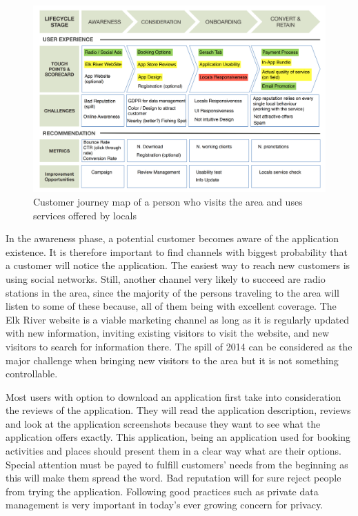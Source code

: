 \begin{figure}[!htb]
\centering
\includegraphics[width=1.0\textwidth]{Img/Customer_journey_map}
\caption{Customer journey map of a person who visits the area and uses services offered by locals}
\end{figure}

In the awareness phase, a potential customer becomes aware of the application existence. It is therefore important to find channels with biggest probability that a customer will notice the application. The easiest way to reach new customers is using social networks. Still, another channel very likely to succeed are radio stations in the area, since the majority of the persons traveling to the area will listen to some of these because, all of them being with excellent coverage. The Elk River website is a viable marketing channel as long as it is regularly updated with new information, inviting existing visitors to visit the website, and new visitors to search for information there. The spill of 2014 can be considered as the major challenge when bringing new visitors to the area but it is not something controllable. 

Most users with option to download an application first take into consideration the reviews of the application. They will read the application description, reviews and look at the application screenshots because they want to see what the application offers exactly. This application, being an application used for booking activities and places should present them in a clear way what are their options. Special attention must be payed to fulfill customers' needs from the beginning as this will make them spread the word. Bad reputation will for sure reject people from trying the application. Following good practices such as private data management is very important in today's ever growing concern for privacy.

